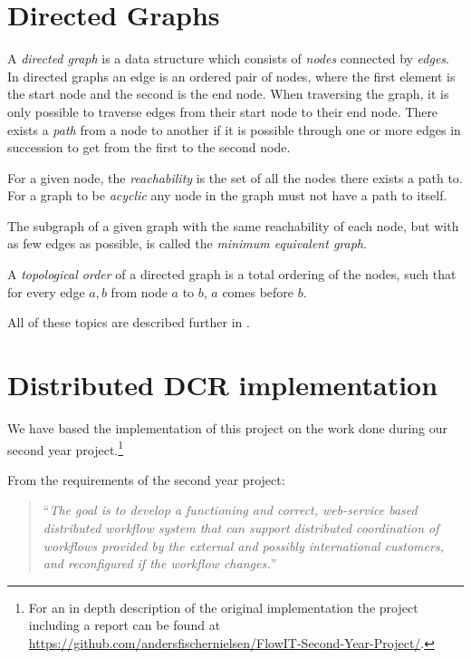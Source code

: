 	\section{Directed Graphs}
		A \textit{directed graph} is a data structure which consists of \textit{nodes} connected by \textit{edges}. In directed graphs an edge is an ordered pair of nodes, where the first element is the start node and the second is the end node. When traversing the graph, it is only possible to traverse edges from their start node to their end node. There exists a \textit{path} from a node to another if it is possible through one or more edges in succession to get from the first to the second node.
	
		For a given node, the \textit{reachability} is the set of all the nodes there exists a path to. For a graph to be \textit{acyclic} any node in the graph must not have a path to itself. 
	
		The subgraph of a given graph with the same reachability of each node, but with as few edges as possible, is called the \textit{minimum equivalent graph}.
	
		A \textit{topological order} of a directed graph is a total ordering of the nodes, such that for every edge $a,b$ from node $a$ to $b$, $a$ comes before $b$.
		
		\newpar All of these topics are described further in \cite{sedgewick2011algorithms}.
		
	\section{Distributed DCR implementation}\label{sec:background:implementation}
		We have based the implementation of this project on the work done during our second year project.\footnote{For an in depth description of the original implementation the project including a report can be found at \url{https://github.com/andersfischernielsen/FlowIT-Second-Year-Project/}.}
		
		\newpar From the requirements of the second year project:
		
		\begin{quotation}
			\noindent``\textit{The goal is to develop a functioning and correct, web-service based distributed workflow system that can support distributed coordination of workflows provided by the external and possibly international customers, and reconfigured if the workflow changes.}''
		\end{quotation}
		
